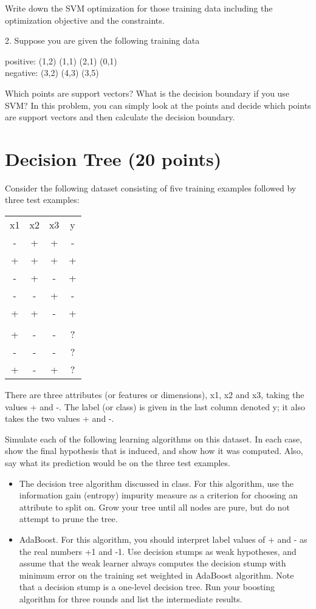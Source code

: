 \documentclass{article}
\begin{document}
Write down the SVM optimization for those training data including the optimization objective and the constraints. 

2. Suppose you are given the following training data 

positive: (1,2) (1,1) (2,1) (0,1)\\
negative: (3,2) (4,3) (3,5)

Which points are support vectors? What is the decision boundary if you use SVM? In this problem, you can simply look at the points and decide which points are support vectors and then calculate the decision boundary. 

\section{Decision Tree (20 points)}



Consider the following dataset consisting of five training examples followed by three test examples:
\begin{center}
\begin{tabular}{ c c c c }
x1 & x2 & x3 & y\\
- & + & + & -\\
+ & + & + & +\\
- & + & - & +\\
- & - & + & -\\
+ & + & - & +\\
\hline \\
+ & - & - & ?\\
- & - & - & ?\\
+ & - & + & ?\\
\end{tabular}
\end{center}



There are three attributes (or features or dimensions), x1, x2 and x3, taking the values +  and -. The label (or class) is given in the last column denoted y; it also takes the two values + and -. 

Simulate each of the following learning algorithms on this dataset. In each case, show the final hypothesis that is induced, and show how it was computed. Also, say what its prediction would be on the three test examples.

\begin{itemize}
\item  The decision tree algorithm discussed in class. For this algorithm, use the information gain (entropy) impurity measure as a criterion for choosing an attribute to split on. Grow your tree until all nodes are pure, but do not attempt to prune the tree.

\item AdaBoost. For this algorithm, you should interpret label values of + and - as the real numbers +1 and -1. Use decision stumps as weak hypotheses, and assume that the weak learner always computes the decision stump with minimum error on the training set weighted in AdaBoost algorithm. Note that a decision stump is a one-level decision tree. Run your boosting algorithm for three rounds and list the intermediate results.

\end{itemize}
\end{document}
